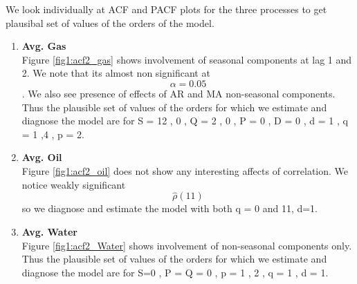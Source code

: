 \documentclass[a4paper]{article}
\begin{document}
\begin{enumerate}
We look individually at ACF and PACF plots for the three processes to get plausibal set of values of the orders of the model.


\begin{enumerate}
	\item \textbf{Avg. Gas}\\
	Figure \ref{fig1:acf2_gas} shows involvement of seasonal components at lag 1 and 2. We note that its almost non significant at $$\alpha = 0.05 $$. We also see presence of effects of AR and MA non-seasonal components. Thus the plausible set of values of the orders for which we estimate and diagnose the model are for 
	S = 12 , 0 , Q = 2 , 0 , P = 0 , D = 0 , d = 1 , q = 1 ,4 , p = 2. 
	
	\item \textbf{Avg. Oil}\\
	Figure \ref{fig1:acf2_oil} does not show any interesting affects of correlation.  We notice weakly significant $$\hat\rho{(11)}$$ so we diagnose and estimate the model with both q = 0 and 11, d=1.
	
	\item \textbf{Avg. Water}\\
	Figure \ref{fig1:acf2_Water} shows involvement of non-seasonal components only. Thus the plausible set of values of the orders for which we estimate and diagnose the model are for 
	S=0 , P = Q = 0 , p = 1 , 2 , q = 1 , d = 1. 
\end{enumerate}
  


\end{enumerate}
\end{document}
